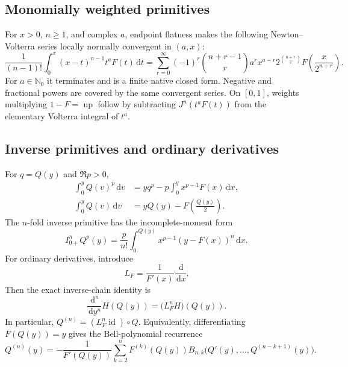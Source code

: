 \documentclass[11pt,oneside]{article}
\theoremstyle{definition}
\theoremstyle{remark}
\newcommand{\Up}{\operatorname{up}}
\newcommand{\N}{\mathbb N}
\newcommand{\dd}{\,\mathrm d}
\newcommand{\fall}[2]{#1^{\underline{#2}}}
\newcommand{\1}{\mathbf 1}
\begin{document}
\subsection{Monomially weighted primitives}

For $x>0$, $n\ge1$, and complex $a$, endpoint flatness makes the following
Newton--Volterra series locally normally convergent in $(a,x)$:
\begin{equation}
 \frac1{(n-1)!}\int_0^x(x-t)^{n-1}t^aF(t)\dd t
 =\sum_{r=0}^{\infty}(-1)^r
 \binom{n+r-1}{r}\fall{a}{r}
 x^{a-r}2^{\binom{n+r}{2}}
 F\!\left(\frac{x}{2^{n+r}}\right).
 \label{p9:eq:weighted-newton-volterra}
\end{equation}
For $a\in\N_0$ it terminates and is a finite native closed form.  Negative and
fractional powers are covered by the same convergent series.  On $[0,1]$,
weights multiplying $1-F=\Up$ follow by subtracting
$J^n(t^aF(t))$ from the elementary Volterra integral of $t^a$.

\subsection{Inverse primitives and ordinary derivatives}

For $q=Q(y)$ and $\Re p>0$,
\begin{align}
 \int_0^yQ(v)^p\dd v
 &=yq^p-p\int_0^qx^{p-1}F(x)\dd x,
 \label{p9:eq:Q-power-primitive}\\
 \int_0^yQ(v)\dd v
 &=yQ(y)-F\!\left(\frac{Q(y)}2\right).
 \label{p9:eq:Q-first-primitive}
\end{align}
The $n$-fold inverse primitive has the incomplete-moment form
\begin{equation}
 I_{0+}^nQ^p(y)
 =\frac{p}{n!}\int_0^{Q(y)}x^{p-1}(y-F(x))^n\dd x.
 \label{p9:eq:Q-n-primitive}
\end{equation}
For ordinary derivatives, introduce
\begin{equation}
 L_F=\frac1{F'(x)}\frac{\dd}{\dd x}.
 \label{p9:eq:LF}
\end{equation}
Then the exact inverse-chain identity is
\begin{equation}
 \frac{\dd^n}{\dd y^n}H(Q(y))
 =\bigl(L_F^nH\bigr)(Q(y)).
 \label{p9:eq:inverse-chain}
\end{equation}
In particular, $Q^{(n)}=(L_F^n\operatorname{id})\circ Q$.  Equivalently,
differentiating $F(Q(y))=y$ gives the Bell-polynomial recurrence
\begin{equation}
 Q^{(n)}(y)
 =-\frac1{F'(Q(y))}
 \sum_{k=2}^nF^{(k)}(Q(y))
 B_{n,k}\bigl(Q'(y),\ldots,Q^{(n-k+1)}(y)\bigr).
 \label{p9:eq:Q-Bell}
\end{equation}
\end{document}

